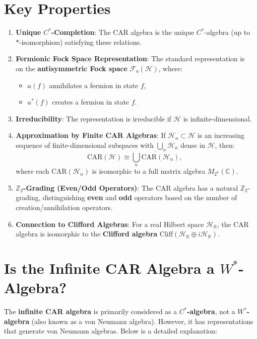 \documentclass{article}
\begin{document}
\section{Key Properties}
\begin{enumerate}
    \item \textbf{Unique \( C^* \)-Completion}:  
    The CAR algebra is the unique \( C^* \)-algebra (up to \(*\)-isomorphism) satisfying these relations.
    
    \item \textbf{Fermionic Fock Space Representation}:  
    The standard representation is on the \textbf{antisymmetric Fock space} \(\mathcal{F}_a(\mathcal{H})\), where:
    \begin{itemize}
        \item \(a(f)\) annihilates a fermion in state \(f\),
        \item \(a^*(f)\) creates a fermion in state \(f\).
    \end{itemize}
    
    \item \textbf{Irreducibility}:  
    The representation is irreducible if \(\mathcal{H}\) is infinite-dimensional.
    
    \item \textbf{Approximation by Finite CAR Algebras}:  
    If \(\mathcal{H}_n \subset \mathcal{H}\) is an increasing sequence of finite-dimensional subspaces with \(\bigcup_n \mathcal{H}_n\) dense in \(\mathcal{H}\), then:
    \[
    \text{CAR}(\mathcal{H}) \cong \overline{\bigcup_n \text{CAR}(\mathcal{H}_n)},
    \]
    where each \(\text{CAR}(\mathcal{H}_n)\) is isomorphic to a full matrix algebra \(M_{2^n}(\mathbb{C})\).
    
    \item \textbf{\(\mathbb{Z}_2\)-Grading (Even/Odd Operators)}:  
    The CAR algebra has a natural \(\mathbb{Z}_2\)-grading, distinguishing \textbf{even} and \textbf{odd} operators based on the number of creation/annihilation operators.
    
    \item \textbf{Connection to Clifford Algebras}:  
    For a real Hilbert space \(\mathcal{H}_\mathbb{R}\), the CAR algebra is isomorphic to the \textbf{Clifford algebra} \(\text{Cliff}(\mathcal{H}_\mathbb{R} \oplus i \mathcal{H}_\mathbb{R})\).
\end{enumerate}

\section{Is the Infinite CAR Algebra a \( W^* \)-Algebra?}
The \textbf{infinite CAR algebra} is primarily considered as a \textbf{\( C^* \)-algebra}, not a \textbf{\( W^* \)-algebra} (also known as a von Neumann algebra). However, it has representations that generate von Neumann algebras. Below is a detailed explanation:
\end{document}

